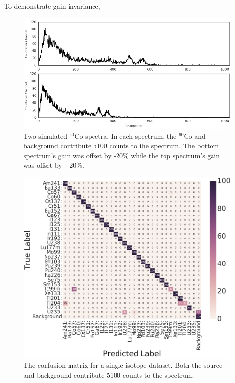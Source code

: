 \documentclass[tocnosub,noragright,centerchapter,12pt,fullpage]{uiucecethesis09}
\begin{document}
To demonstrate gain invariance, 


\begin{figure}[H]
\centering
\includegraphics[width=0.75\linewidth]{images/Co60_both_60s}
\caption{Two simulated $^{60}$Co spectra. In each spectrum, the $^{60}$Co and background contribute 5100 counts to the spectrum. The bottom spectrum's gain was offset by -20\% while the top spectrum's gain was offset by +20\%.}
\label{fig:co60_diff_pmt_60s}
\end{figure}




\begin{figure}[H]
\centering
\includegraphics[width=0.7\linewidth]{images/conf_matrix_60s}
\caption{The confusion matrix for a single isotope dataset. Both the source and background contribute 5100 counts to the spectrum.}
\label{fig:conf_matrix_60s}
\end{figure}
\end{document}

